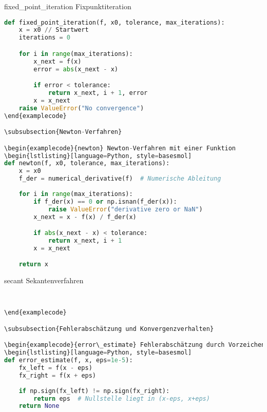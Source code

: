 \begin{examplecode}{fixed\_point\_iteration} Fixpunktiteration 
\begin{lstlisting}[language=Python, style=basesmol]
def fixed_point_iteration(f, x0, tolerance, max_iterations):
    x = x0 // Startwert
    iterations = 0

    for i in range(max_iterations):
        x_next = f(x)
        error = abs(x_next - x)

        if error < tolerance:
            return x_next, i + 1, error
        x = x_next
    raise ValueError("No convergence")
\end{examplecode}

\subsubsection{Newton-Verfahren}

\begin{examplecode}{newton} Newton-Verfahren mit einer Funktion
\begin{lstlisting}[language=Python, style=basesmol]
def newton(f, x0, tolerance, max_iterations):
    x = x0
    f_der = numerical_derivative(f)  # Numerische Ableitung
    
    for i in range(max_iterations):
        if f_der(x) == 0 or np.isnan(f_der(x)):
            raise ValueError("derivative zero or NaN")
        x_next = x - f(x) / f_der(x)

        if abs(x_next - x) < tolerance:
            return x_next, i + 1
        x = x_next

    return x
\end{lstlisting}
\end{examplecode}

\begin{examplecode}{secant} Sekantenverfahren
\begin{lstlisting}[language=Python, style=basesmol]

    
\end{examplecode}

\subsubsection{Fehlerabschätzung und Konvergenzverhalten}

\begin{examplecode}{error\_estimate} Fehlerabschätzung durch Vorzeichenwechsel
\begin{lstlisting}[language=Python, style=basesmol]
def error_estimate(f, x, eps=1e-5):
    fx_left = f(x - eps)
    fx_right = f(x + eps)
    
    if np.sign(fx_left) != np.sign(fx_right):
        return eps  # Nullstelle liegt in (x-eps, x+eps)
    return None
\end{lstlisting}
\end{examplecode}

